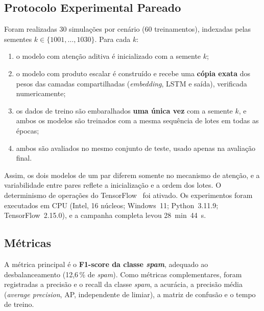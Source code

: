 \documentclass[conference]{IEEEtran}
\begin{document}
\subsection{Protocolo Experimental Pareado}
Foram realizadas 30 simulações por cenário (60 treinamentos), indexadas pelas sementes $k \in \{1001,\dots,1030\}$. Para cada $k$:
\begin{enumerate}
  \item o modelo com atenção aditiva é inicializado com a semente $k$;
  \item o modelo com produto escalar é construído e recebe uma \textbf{cópia exata} dos pesos das camadas compartilhadas (\textit{embedding}, LSTM e saída), verificada numericamente;
  \item os dados de treino são embaralhados \textbf{uma única vez} com a semente $k$, e ambos os modelos são treinados com a mesma sequência de lotes em todas as épocas;
  \item ambos são avaliados no mesmo conjunto de teste, usado apenas na avaliação final.
\end{enumerate}
Assim, os dois modelos de um par diferem somente no mecanismo de atenção, e a variabilidade entre pares reflete a inicialização e a ordem dos lotes. O determinismo de operações do TensorFlow~\cite{tensorflow} foi ativado. Os experimentos foram executados em CPU (Intel, 16 núcleos; Windows~11; Python~3.11.9; TensorFlow~2.15.0), e a campanha completa levou 28~min~44~s.

\subsection{Métricas}
A métrica principal é o \textbf{F1-score da classe \textit{spam}}, adequado ao desbalanceamento (12,6\,\% de \textit{spam}). Como métricas complementares, foram registradas a precisão e o recall da classe \textit{spam}, a acurácia, a precisão média (\textit{average precision}, AP, independente de limiar), a matriz de confusão e o tempo de treino.
\end{document}
